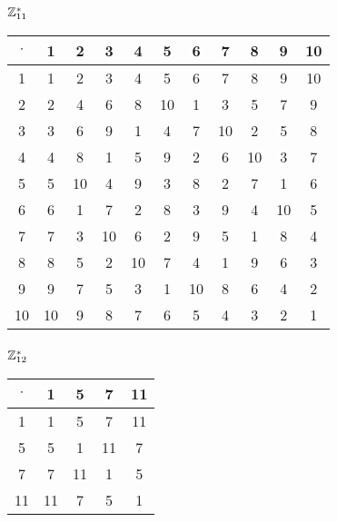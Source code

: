 \subsubsection{$\mathbb{Z}_{11}^*$}
\begin{tabular}{|c|c|c|c|c|c|c|c|c|c|c|}
\hline $\cdot$  & 1 & 2 & 3 & 4 & 5 & 6 & 7 & 8 & 9 & 10\\
\hline 1 & 1 & 2 & 3 & 4 & 5 & 6 & 7 & 8 & 9 & 10\\
\hline 2 & 2 & 4 & 6 & 8 & 10 & 1 & 3 & 5 & 7 & 9\\
\hline 3 & 3 & 6 & 9 & 1 & 4 & 7 & 10 & 2 & 5 & 8\\
\hline 4 & 4 & 8 & 1 & 5 & 9 & 2 & 6 & 10 & 3 & 7\\
\hline 5 & 5 & 10 & 4 & 9 & 3 & 8 & 2 & 7 & 1 & 6\\
\hline 6 & 6 & 1 & 7 & 2 & 8 & 3 & 9 & 4 & 10 & 5\\
\hline 7 & 7 & 3 & 10 & 6 & 2 & 9 & 5 & 1 & 8 & 4\\
\hline 8 & 8 & 5 & 2 & 10 & 7 & 4 & 1 & 9 & 6 & 3\\
\hline 9 & 9 & 7 & 5 & 3 & 1 & 10 & 8 & 6 & 4 & 2\\
\hline 10 & 10 & 9 & 8 & 7 & 6 & 5 & 4 & 3 & 2 & 1\\
\hline
\end{tabular}


\subsubsection{$\mathbb{Z}_{12}^*$}
\begin{tabular}{|c|c|c|c|c|}
\hline $\cdot$  & 1 & 5 & 7 & 11\\
\hline 1 & 1 & 5 & 7 & 11\\
\hline 5 & 5 & 1 & 11 & 7\\
\hline 7 & 7 & 11 & 1 & 5\\
\hline 11 & 11 & 7 & 5 & 1\\
\hline
\end{tabular}


